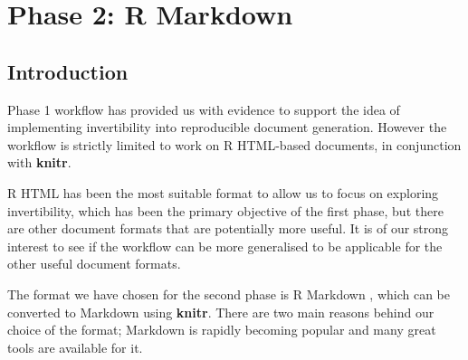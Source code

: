 \documentclass[a4paper, 12pt]{report}
\begin{document}
\chapter{Phase 2: R Markdown}
\begin{figure}[h]
\centering
\end{figure}

\section{Introduction}
Phase 1 workflow has provided us with evidence to support the idea of implementing invertibility into reproducible document generation. However the workflow is strictly limited to work on R HTML-based documents, in conjunction with \textbf{knitr}.

R HTML has been the most suitable format to allow us to focus on exploring invertibility, which has been the primary objective of the first phase, but there are other document formats that are potentially more useful. It is of our strong interest to see if the workflow can be more generalised to be applicable for the other useful document formats.

The format we have chosen for the second phase is R Markdown \citep{rmarkdown}, which can be converted to Markdown \citep{markdown} using \textbf{knitr}. There are two main reasons behind our choice of the format; Markdown is rapidly becoming popular and many great tools are available for it.


\end{document}
